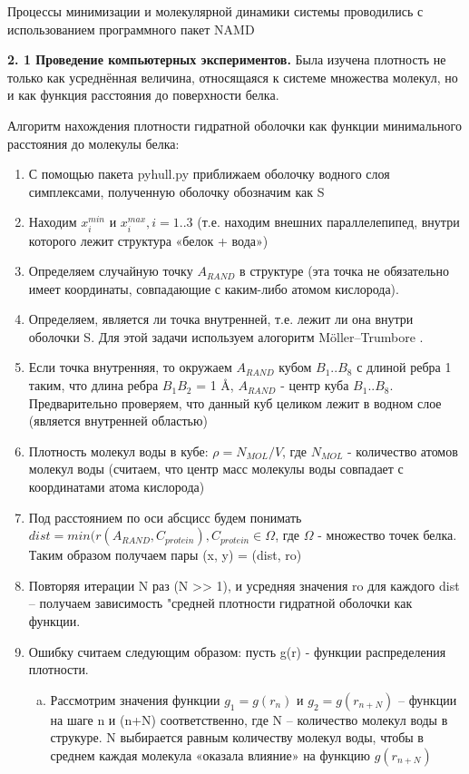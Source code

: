 \documentclass[a4paper]{article}
\begin{document}
Процессы минимизации и молекулярной динамики системы проводились с использованием программного пакет NAMD \cite{namd}

\textbf{2. 1 Проведение компьютерных экспериментов.} Была изучена плотность не только как усреднённая величина, относящаяся к системе множества молекул, но и как функция расстояния до поверхности белка.

Алгоритм нахождения плотности гидратной оболочки как функции минимального расстояния до молекулы белка:
\begin{enumerate}
\item С помощью пакета pyhull.py \cite{pyhull} приближаем оболочку водного слоя симплексами,
полученную оболочку обозначим как S
\item Находим $x_i^{min}$ и $x_i^{max}, i=1..3$ (т.е. находим внешних параллелепипед, внутри 
которого лежит структура «белок + вода»)
\item Определяем случайную точку $A_{RAND}$ в структуре (эта точка не обязательно имеет
координаты, совпадающие с каким-либо атомом кислорода).
\item Определяем, является ли точка внутренней, т.е. лежит ли она внутри оболочки S. Для этой
задачи используем алогоритм Möller–Trumbore \cite{moeller}.
\item Если точка внутренняя, то окружаем $A_{RAND}$  кубом $B_1..B_8$  с длиной ребра 1 таким, что длина ребра $B_1B_2$ = 1 \AA, $A_{RAND}$ - центр куба $B_1..B_8$. Предварительно проверяем, что данный куб
целиком лежит  в водном слое (является внутренней областью)
\item Плотность молекул воды в кубе: $\rho = N_{MOL}/V $, где $ N_{MOL} $ - количество атомов молекул
воды (считаем, что центр масс молекулы воды совпадает с координатами атома кислорода)
\item Под расстоянием по оси абсцисс будем понимать $ dist = min( r(A_{RAND}, C_{protein}), C_{protein} \in \Omega$, где $\Omega$ - множество точек белка. Таким образом получаем пары (x, y) = (dist, ro)
\item Повторяя итерации N раз (N >> 1), и усредняя значения ro для каждого dist – получаем
зависимость "средней плотности гидратной оболочки как функции.

\item Ошибку считаем следующим образом: пусть g(r) - функции распределения плотности. 
\begin{enumerate}[(a)]
\item Рассмотрим значения функции $ g_1 = g(r_n) $ и $ g_2 = g(r_{n+N}) $ – функции на
шаге n и (n+N) соответственно, где N – количество молекул воды в струкуре. N выбирается
равным количеству молекул воды, чтобы в среднем каждая молекула «оказала влияние» на
функцию $ g(r_{n+N}) $ 


\end{enumerate}
\end{enumerate}
\end{document}
